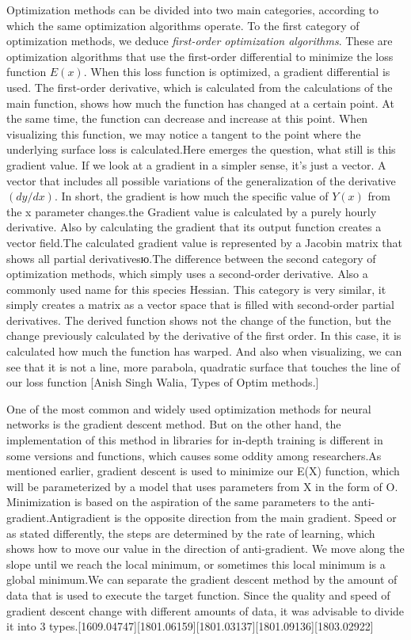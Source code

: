 Optimization methods can be divided into two main categories, according to which the same optimization algorithms operate. To the first category of optimization methods, we deduce \textit{ first-order optimization algorithms}. These are optimization algorithms that use the first-order differential to minimize the loss function $E (x)$. When this loss function is optimized, a gradient differential is used. The first-order derivative, which is calculated from the calculations of the main function, shows how much the function has changed at a certain point. At the same time, the function can decrease and increase at this point. When visualizing this function, we may notice a tangent to the point where the underlying surface loss is calculated.Here emerges the question, what still is this gradient value. If we look at a gradient in a simpler sense, it's just a vector. A vector that includes all possible variations of the generalization of the derivative $(dy/dx)$. In short, the gradient is how much the specific value of $Y(x)$ from the x parameter changes.the Gradient value is calculated by a purely hourly derivative. Also by calculating the gradient that its output function creates a vector field.The calculated gradient value is represented by a Jacobin matrix that shows all partial derivativesю.The difference between the second category of optimization methods, which simply uses a second-order derivative. Also a commonly used name for this species Hessian. This category is very similar, it simply creates a matrix as a vector space that is filled with second-order partial derivatives. The derived function shows not the change of the function, but the change previously calculated by the derivative of the first order. In this case, it is calculated how much the function has warped. And also when visualizing, we can see that it is not a line, more parabola, quadratic surface that touches the line of our loss function [Anish Singh Walia, Types of Optim methods.]



\vspace{-0.5cm}
\noindent One of the most common and widely used optimization methods for neural networks is the gradient descent method. But on the other hand, the implementation of this method in libraries for in-depth training is different in some versions and functions, which causes some oddity among researchers.As mentioned earlier, gradient descent is used to minimize our E(X) function, which will be parameterized by a model that uses parameters from X in the form of O. Minimization is based on the aspiration of the same parameters to the anti-gradient.Antigradient is the opposite direction from the main gradient. Speed or as stated differently, the steps are determined by the rate of learning, which shows how to move our value in the direction of anti-gradient. We move along the slope until we reach the local minimum, or sometimes this local minimum is a global minimum.We can separate the gradient descent method by the amount of data that is used to execute the target function. Since the quality and speed of gradient descent change with different amounts of data, it was advisable to divide it into 3 types.[1609.04747][1801.06159][1801.03137][1801.09136][1803.02922]


